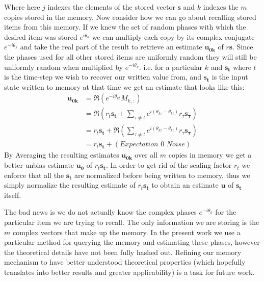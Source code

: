 \documentclass{article}
\begin{document}
Where here $j$ indexes the elements of the stored vector $\pmb{s}$ and $k$ indexes the $m$ copies stored in the memory. Now consider how we can go about recalling stored items from this memory. If we knew the set of random phases with which the desired item was stored $e^{i\theta_k}$ we can multiply each copy by its complex conjugate $e^{-i\theta_k}$ and take the real part of the result to retrieve an estimate $\pmb{u_{0k}}$ of $r\pmb{s}$. Since the phases used for all other stored items are uniformly random they will still be uniformly random when multiplied by $e^{-i\theta_k}$. i.e. for a particular $k$ and $\pmb{s_t}$ where $t$ is the time-step we wish to recover our written value from, and $\pmb{s_t}$ is the input state written to memory at that time we get an estimate that looks like this:
\begin{align*}
\pmb{u_{0k}}&=\Re(e^{-i\theta_{kt}}M_{k,:})\\
&=\Re(r_t\pmb{s_t}+\sum_{\tau\neq t}e^{i(\theta_{k\tau}-\theta_{kt})}r_\tau\pmb{s_\tau})\\
&=r_t\pmb{s_t}+\Re(\sum_{\tau\neq t}e^{i(\theta_{k\tau}-\theta_{kt})}r_\tau\pmb{s_\tau})\\
&=r_t\pmb{s_t}+(\textit{Expectation 0 Noise})
\end{align*}
By Averaging the resulting estimates $\pmb{u_{0k}}$ over all $m$ copies in memory we get a better unbias estimate $\pmb{u_0}$ of $r_t\pmb{s_t}$. In order to get rid of the scaling factor $r_t$ we enforce that all the $\pmb{s_t}$ are normalized before being written to memory, thus we simply normalize the resulting estimate of $r_t\pmb{s_t}$ to obtain an estimate $\pmb{u}$ of $\pmb{s_t}$ itself.

The bad news is we do not actually know the complex phases $e^{-i\theta_k}$ for the particular item we are trying to recall. The only information we are storing is the $m$ complex vectors that make up the memory. In the present work we use a particular method for querying the memory and estimating these phases, however the theoretical details have not been fully hashed out. Refining our memory mechanism to have better understood theoretical properties (which hopefully translates into better results and greater applicability) is a task for future work.
\end{document}
